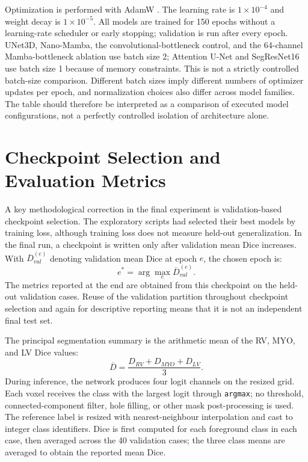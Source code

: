 Optimization is performed with AdamW \citep{loshchilov2017decoupled}. The learning rate is $1\times10^{-4}$ and weight decay is $1\times10^{-5}$. All models are trained for 150 epochs without a learning-rate scheduler or early stopping; validation is run after every epoch. UNet3D, Nano-Mamba, the convolutional-bottleneck control, and the 64-channel Mamba-bottleneck ablation use batch size 2; Attention U-Net and SegResNet16 use batch size 1 because of memory constraints. This is not a strictly controlled batch-size comparison. Different batch sizes imply different numbers of optimizer updates per epoch, and normalization choices also differ across model families. The table should therefore be interpreted as a comparison of executed model configurations, not a perfectly controlled isolation of architecture alone.

\section{Checkpoint Selection and Evaluation Metrics}
A key methodological correction in the final experiment is validation-based checkpoint selection. The exploratory scripts had selected their best models by training loss, although training loss does not measure held-out generalization. In the final run, a checkpoint is written only after validation mean Dice increases. With $\overline{D}^{(e)}_{val}$ denoting validation mean Dice at epoch $e$, the chosen epoch is:
\begin{equation}
    e^*=\arg\max_e \overline{D}^{(e)}_{val}.
\end{equation}
The metrics reported at the end are obtained from this checkpoint on the held-out validation cases. Reuse of the validation partition throughout checkpoint selection and again for descriptive reporting means that it is not an independent final test set.

The principal segmentation summary is the arithmetic mean of the RV, MYO, and LV Dice values:
\begin{equation}
    \overline{D}=\frac{D_{RV}+D_{MYO}+D_{LV}}{3}.
\end{equation}
During inference, the network produces four logit channels on the resized grid. Each voxel receives the class with the largest logit through \texttt{argmax}; no threshold, connected-component filter, hole filling, or other mask post-processing is used. The reference label is resized with nearest-neighbour interpolation and cast to integer class identifiers. Dice is first computed for each foreground class in each case, then averaged across the 40 validation cases; the three class means are averaged to obtain the reported mean Dice.

